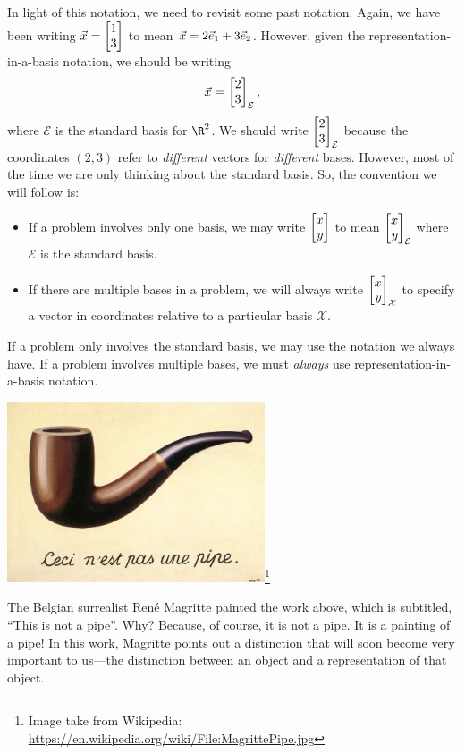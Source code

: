 In light of this notation, we need to revisit some past notation. Again, we have been writing $\vec x=\mat{1\\3}$ to mean
$\vec x=2{\vec e_1}+3{\vec e_2}$. However, given the representation-in-a-basis notation, we should be writing
\[
	\vec x=\mat{2\\3}_{\mathcal E},
\]
where $\mathcal E$ is the standard basis for $\R^2$. We should write $\mat{2\\3}_{\mathcal E}$ because the coordinates $(2,3)$
refer to \emph{different} vectors for \emph{different} bases. However, most of the time we are only thinking about the standard
basis. So, the convention we will follow is:
\begin{itemize}
	\item If a problem involves only one basis, we may write $\mat{x\\y}$ to mean $\mat{x\\y}_{\mathcal E}$ where
	$\mathcal E$ is the standard basis.
	\item If there are multiple bases in a problem, we will always write $\mat{x\\y}_{\mathcal X}$ to specify a vector in
	coordinates relative to a particular basis $\mathcal X$.
\end{itemize}

\begin{emphbox}[Takeaway]
	If a problem only involves the standard basis, we may use the notation we always have. If a problem involves
	multiple bases, we must \emph{always} use representation-in-a-basis notation.
\end{emphbox}



\begin{center}
\includegraphics[width=3in]{images/MagrittePipe.jpg}\footnote{Image take from Wikipedia: \url{https://en.wikipedia.org/wiki/File:MagrittePipe.jpg}} 
\end{center}
The Belgian surrealist Ren\'e Magritte painted the work above, which is subtitled, ``This is not a pipe''. Why? Because, of course, it is not
a pipe. It is a painting of a pipe! In this work, Magritte points out a distinction that will soon become very important to
us---the distinction between an object and a representation of that object.



